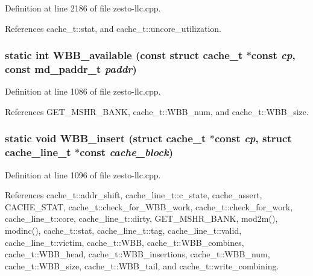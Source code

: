 Definition at line 2186 of file zesto-llc.cpp.

References cache\_\-t::stat, and cache\_\-t::uncore\_\-utilization.
\subsubsection[{WBB\_\-available}]{\setlength{\rightskip}{0pt plus 5cm}static int WBB\_\-available (const struct {\bf cache\_\-t} $\ast$const  {\em cp}, \/  const {\bf md\_\-paddr\_\-t} {\em paddr})\hspace{0.3cm}{\tt  [inline, static]}}\label{zesto-llc_8cpp_48f8188c331e3c2188868d0f1c577d5a}




Definition at line 1086 of file zesto-llc.cpp.

References GET\_\-MSHR\_\-BANK, cache\_\-t::WBB\_\-num, and cache\_\-t::WBB\_\-size.
\subsubsection[{WBB\_\-insert}]{\setlength{\rightskip}{0pt plus 5cm}static void WBB\_\-insert (struct {\bf cache\_\-t} $\ast$const  {\em cp}, \/  struct {\bf cache\_\-line\_\-t} $\ast$const  {\em cache\_\-block})\hspace{0.3cm}{\tt  [static]}}\label{zesto-llc_8cpp_54a68443796a201ceb5456ce0fc69bc4}




Definition at line 1096 of file zesto-llc.cpp.

References cache\_\-t::addr\_\-shift, cache\_\-line\_\-t::c\_\-state, cache\_\-assert, CACHE\_\-STAT, cache\_\-t::check\_\-for\_\-WBB\_\-work, cache\_\-t::check\_\-for\_\-work, cache\_\-line\_\-t::core, cache\_\-line\_\-t::dirty, GET\_\-MSHR\_\-BANK, mod2m(), modinc(), cache\_\-t::stat, cache\_\-line\_\-t::tag, cache\_\-line\_\-t::valid, cache\_\-line\_\-t::victim, cache\_\-t::WBB, cache\_\-t::WBB\_\-combines, cache\_\-t::WBB\_\-head, cache\_\-t::WBB\_\-insertions, cache\_\-t::WBB\_\-num, cache\_\-t::WBB\_\-size, cache\_\-t::WBB\_\-tail, and cache\_\-t::write\_\-combining.
